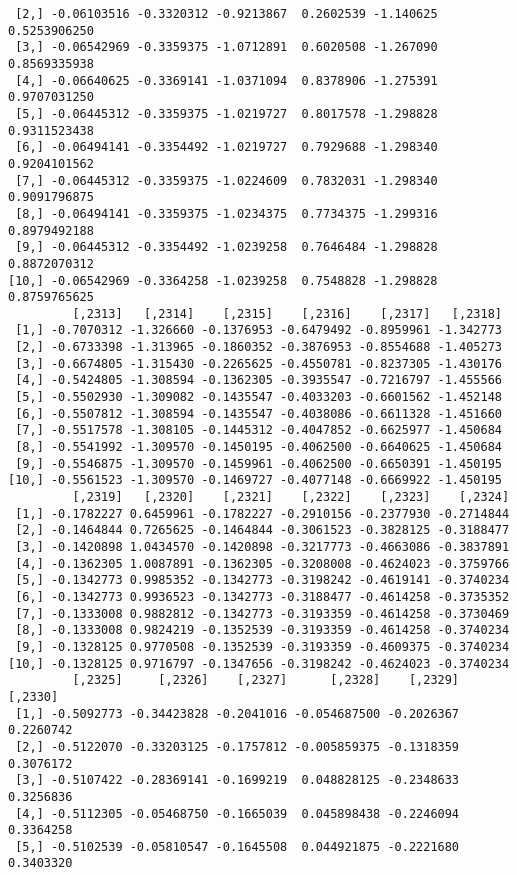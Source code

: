 \documentclass[
  letterpaper,
  DIV=11,
  numbers=noendperiod]{scrreprt}
\begin{document}
\begin{verbatim}
 [2,] -0.06103516 -0.3320312 -0.9213867  0.2602539 -1.140625  0.5253906250
 [3,] -0.06542969 -0.3359375 -1.0712891  0.6020508 -1.267090  0.8569335938
 [4,] -0.06640625 -0.3369141 -1.0371094  0.8378906 -1.275391  0.9707031250
 [5,] -0.06445312 -0.3359375 -1.0219727  0.8017578 -1.298828  0.9311523438
 [6,] -0.06494141 -0.3354492 -1.0219727  0.7929688 -1.298340  0.9204101562
 [7,] -0.06445312 -0.3359375 -1.0224609  0.7832031 -1.298340  0.9091796875
 [8,] -0.06494141 -0.3359375 -1.0234375  0.7734375 -1.299316  0.8979492188
 [9,] -0.06445312 -0.3354492 -1.0239258  0.7646484 -1.298828  0.8872070312
[10,] -0.06542969 -0.3364258 -1.0239258  0.7548828 -1.298828  0.8759765625
         [,2313]   [,2314]    [,2315]    [,2316]    [,2317]   [,2318]
 [1,] -0.7070312 -1.326660 -0.1376953 -0.6479492 -0.8959961 -1.342773
 [2,] -0.6733398 -1.313965 -0.1860352 -0.3876953 -0.8554688 -1.405273
 [3,] -0.6674805 -1.315430 -0.2265625 -0.4550781 -0.8237305 -1.430176
 [4,] -0.5424805 -1.308594 -0.1362305 -0.3935547 -0.7216797 -1.455566
 [5,] -0.5502930 -1.309082 -0.1435547 -0.4033203 -0.6601562 -1.452148
 [6,] -0.5507812 -1.308594 -0.1435547 -0.4038086 -0.6611328 -1.451660
 [7,] -0.5517578 -1.308105 -0.1445312 -0.4047852 -0.6625977 -1.450684
 [8,] -0.5541992 -1.309570 -0.1450195 -0.4062500 -0.6640625 -1.450684
 [9,] -0.5546875 -1.309570 -0.1459961 -0.4062500 -0.6650391 -1.450195
[10,] -0.5561523 -1.309570 -0.1469727 -0.4077148 -0.6669922 -1.450195
         [,2319]   [,2320]    [,2321]    [,2322]    [,2323]    [,2324]
 [1,] -0.1782227 0.6459961 -0.1782227 -0.2910156 -0.2377930 -0.2714844
 [2,] -0.1464844 0.7265625 -0.1464844 -0.3061523 -0.3828125 -0.3188477
 [3,] -0.1420898 1.0434570 -0.1420898 -0.3217773 -0.4663086 -0.3837891
 [4,] -0.1362305 1.0087891 -0.1362305 -0.3208008 -0.4624023 -0.3759766
 [5,] -0.1342773 0.9985352 -0.1342773 -0.3198242 -0.4619141 -0.3740234
 [6,] -0.1342773 0.9936523 -0.1342773 -0.3188477 -0.4614258 -0.3735352
 [7,] -0.1333008 0.9882812 -0.1342773 -0.3193359 -0.4614258 -0.3730469
 [8,] -0.1333008 0.9824219 -0.1352539 -0.3193359 -0.4614258 -0.3740234
 [9,] -0.1328125 0.9770508 -0.1352539 -0.3193359 -0.4609375 -0.3740234
[10,] -0.1328125 0.9716797 -0.1347656 -0.3198242 -0.4624023 -0.3740234
         [,2325]     [,2326]    [,2327]      [,2328]    [,2329]   [,2330]
 [1,] -0.5092773 -0.34423828 -0.2041016 -0.054687500 -0.2026367 0.2260742
 [2,] -0.5122070 -0.33203125 -0.1757812 -0.005859375 -0.1318359 0.3076172
 [3,] -0.5107422 -0.28369141 -0.1699219  0.048828125 -0.2348633 0.3256836
 [4,] -0.5112305 -0.05468750 -0.1665039  0.045898438 -0.2246094 0.3364258
 [5,] -0.5102539 -0.05810547 -0.1645508  0.044921875 -0.2221680 0.3403320

\end{verbatim}
\end{document}
